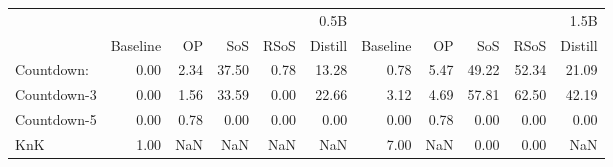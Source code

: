 \begin{tabular}{lrrrrrrrrrr}
\toprule
 & \multicolumn{5}{r}{0.5B} & \multicolumn{5}{r}{1.5B} \\
 & Baseline & OP & SoS & RSoS & Distill & Baseline & OP & SoS & RSoS & Distill \\
\midrule
Countdown: & 0.00 & 2.34 & 37.50 & 0.78 & 13.28 & 0.78 & 5.47 & 49.22 & 52.34 & 21.09 \\
Countdown-3 & 0.00 & 1.56 & 33.59 & 0.00 & 22.66 & 3.12 & 4.69 & 57.81 & 62.50 & 42.19 \\
Countdown-5 & 0.00 & 0.78 & 0.00 & 0.00 & 0.00 & 0.00 & 0.78 & 0.00 & 0.00 & 0.00 \\
KnK & 1.00 & NaN & NaN & NaN & NaN & 7.00 & NaN & 0.00 & 0.00 & NaN \\
\bottomrule
\end{tabular}
